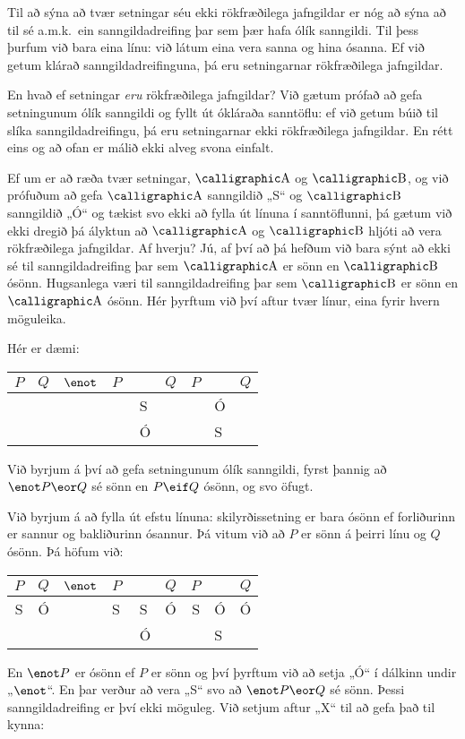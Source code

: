 Til að sýna að tvær setningar séu ekki rökfræðilega jafngildar er nóg að sýna að til sé a.m.k.\ ein sanngildadreifing þar sem þær hafa ólík sanngildi. Til þess þurfum við bara eina línu: við látum eina vera sanna og hina ósanna. Ef við getum klárað sanngildadreifinguna, þá eru setningarnar rökfræðilega jafngildar.

En hvað ef setningar \emph{eru} rökfræðilega jafngildar? Við gætum prófað að gefa setningunum ólík sanngildi og fyllt út ókláraða sanntöflu: ef við getum búið til slíka sanngildadreifingu, þá eru setningarnar ekki rökfræðilega jafngildar. En rétt eins og að ofan er málið ekki alveg svona einfalt. 

Ef um er að ræða tvær setningar, $\meta{A}$ og $\meta{B}$, og við prófuðum að gefa $\meta{A}$ sanngildið „S“ og $\meta{B}$ sanngildið „Ó“ og tækist svo ekki að fylla út línuna í sanntöflunni, þá gætum við ekki dregið þá ályktun að $\meta{A}$ og $\meta{B}$ hljóti að vera rökfræðilega jafngildar. Af hverju? Jú, af því að þá hefðum við bara sýnt að ekki sé til sanngildadreifing þar sem $\meta{A}$ er sönn en $\meta{B}$ ósönn. Hugsanlega væri til sanngildadreifing þar sem $\meta{B}$ er sönn en $\meta{A}$ ósönn. Hér þyrftum við því aftur tvær línur, eina fyrir hvern möguleika.

Hér er dæmi: 

\begin{center}
	\begin{tabular}{c c|d e e f | d e f}
		$P$&$Q$&$\enot$&$P\;$&\eor&$Q$&$P$&\eif&$Q$\\
		\hline
		 &  & & & S & & & Ó & \\
		 &  & & & Ó & & & S &
	\end{tabular}
\end{center}
Við byrjum á því að gefa setningunum ólík sanngildi, fyrst þannig að $\enot P \eor Q$ sé sönn en $P \eif Q$ ósönn, og svo öfugt.
 
Við byrjum á að fylla út efstu línuna: skilyrðissetning er bara ósönn ef forliðurinn er sannur og bakliðurinn ósannur. Þá vitum við að $P$ er sönn á þeirri línu og $Q$ ósönn. Þá höfum við:

\begin{center}
	\begin{tabular}{c c|d e e f | d e f}
		$P$&$Q$&$\enot$&$P\;$&\eor&$Q$&$P$&\eif&$Q$\\
		\hline
		 S & Ó & & S & S & Ó & S & Ó & Ó\\
		 &  & & & Ó & & & S &
	\end{tabular}
\end{center}
En $\enot P$ er ósönn ef $P$ er sönn og því þyrftum við að setja „Ó“ í dálkinn undir „$\enot$“. En þar verður að vera „S“ svo að $\enot P \eor Q$ sé sönn. Þessi sanngildadreifing er því ekki möguleg. Við setjum aftur „X“ til að gefa það til kynna:

